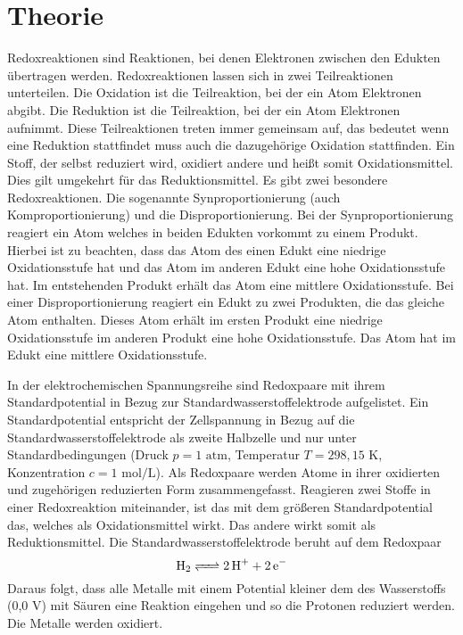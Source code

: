 \section{Theorie}
Redoxreaktionen sind Reaktionen, bei denen Elektronen zwischen den Edukten
übertragen werden. Redoxreaktionen lassen sich in zwei Teilreaktionen unterteilen.
Die Oxidation ist die Teilreaktion, bei der ein Atom Elektronen abgibt. Die Reduktion ist die Teilreaktion, bei der ein Atom Elektronen aufnimmt. Diese Teilreaktionen treten immer gemeinsam auf, das bedeutet wenn eine Reduktion stattfindet
muss auch die dazugehörige Oxidation stattfinden. Ein Stoff, der selbst reduziert
wird, oxidiert andere und heißt somit Oxidationsmittel. Dies gilt umgekehrt für das
Reduktionsmittel. Es gibt zwei besondere Redoxreaktionen. Die sogenannte Synproportionierung (auch Komproportionierung) und die Disproportionierung. Bei
der Synproportionierung reagiert ein Atom welches in beiden Edukten vorkommt
zu einem Produkt. Hierbei ist zu beachten, dass das Atom des einen Edukt eine
niedrige Oxidationsstufe hat und das Atom im anderen Edukt eine hohe Oxidationsstufe hat. Im entstehenden Produkt erhält das Atom eine mittlere Oxidationsstufe. Bei einer Disproportionierung reagiert ein Edukt zu zwei Produkten, die
das gleiche Atom enthalten. Dieses Atom erhält im ersten Produkt eine niedrige
Oxidationsstufe im anderen Produkt eine hohe Oxidationsstufe. Das Atom hat im
Edukt eine mittlere Oxidationsstufe.\supercite{Jander*Blasius}

In der elektrochemischen Spannungsreihe sind Redoxpaare mit ihrem Standardpotential in Bezug zur Standardwasserstoffelektrode aufgelistet. Ein Standardpotential entspricht der Zellspannung in Bezug auf die Standardwasserstoffelektrode
als zweite Halbzelle und nur unter Standardbedingungen (Druck $p=1$ $\mathrm{atm}$, Temperatur $T=298,15$ $\mathrm{K}$, Konzentration $c=1$ $\mathrm{mol/L}$). Als Redoxpaare werden
Atome in ihrer oxidierten und zugehörigen reduzierten Form zusammengefasst.
Reagieren zwei Stoffe in einer Redoxreaktion miteinander, ist das mit dem größeren Standardpotential das,
welches als Oxidationsmittel wirkt. Das andere wirkt somit als Reduktionsmittel.
Die Standardwasserstoffelektrode beruht auf dem Redoxpaar
\begin{equation}
    \ce{H2 <=> 2H^+ + 2e-}
\end{equation}
Daraus folgt, dass alle Metalle mit einem Potential kleiner dem des Wasserstoffs
(0,0 $\mathrm{V}$) mit Säuren eine Reaktion eingehen und so die Protonen reduziert werden.
Die Metalle werden oxidiert.\supercite{skript}\\

